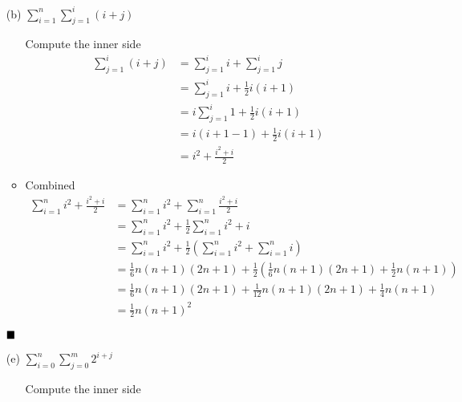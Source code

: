 \documentclass{article}
\def\math#1{$#1$}
\begin{document}
\begin{itemize}
    \item [(b)] \math{\sum_{i=1}^n \sum_{j=1}^i (i+j)}
        \begin{itemize}
            \item [Compute the inner side] \begin{equation}
                \begin{split}
                    \sum_{j=1}^i (i+j) &= \sum_{j=1}^i i + \sum_{j=1}^i j \\
                    &= \sum_{j=1}^i i+\frac{1}{2}i(i+1) \\ 
                    &= i\sum_{j=1}^i 1 + \frac{1}{2}i(i+1) \\
                    &= i(i + 1 - 1) + \frac{1}{2}i(i+1) \\
                    &= i^2 + \frac{i^2 + i}{2}
                \end{split}
            \end{equation}
            \item Combined
                \begin{equation}
                    \begin{split}
                       \sum_{i=1}^n i^2 + \frac{i^2 + i}{2} &= \sum_{i=1}^n i^2 + \sum_{i=1}^n \frac{i^2 + i}{2} \\
                       &= \sum_{i=1}^n i^2 + \frac{1}{2} \sum_{i=1}^n i^2 + i \\
                       &= \sum_{i=1}^n i^2 + \frac{1}{2} (\sum_{i=1}^n i^2 + \sum_{i=1}^n i) \\
                       &= \frac{1}{6}n(n+1)(2n+1) + \frac{1}{2}(\frac{1}{6}n(n+1)(2n+1) + \frac{1}{2}n(n+1)) \\
                       &= \frac{1}{6}n(n+1)(2n+1) + \frac{1}{12}n(n+1)(2n+1) + \frac{1}{4}n(n+1) \\
                       &= \frac{1}{2}n{(n+1)}^2
                    \end{split}
                \end{equation}
        \end{itemize}
        \math{\hfill{\blacksquare}}
    \item [(e)] \math{\sum_{i=0}^n \sum_{j=0}^m 2^{i+j}}
        \begin{itemize}
            \item [Compute the inner side] \begin{equation}
                \begin{split}

\end{split}
\end{equation}
\end{itemize}
\end{itemize}
\end{document}
